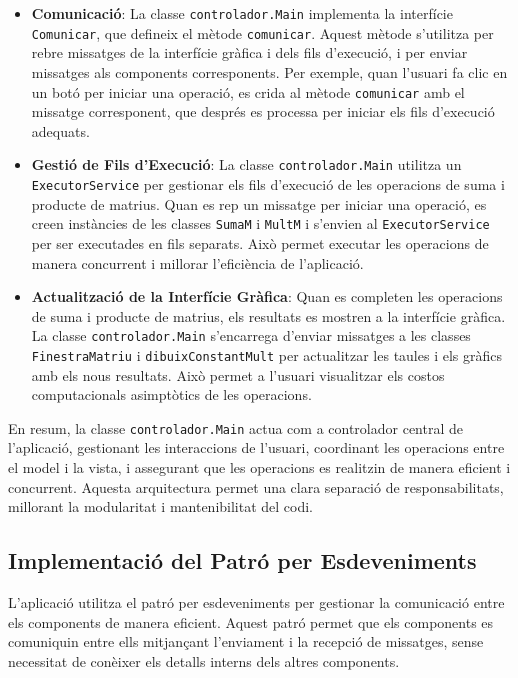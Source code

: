 \documentclass{ieeetj}
\begin{document}
\begin{itemize}
\begin{itemize}
    \item \textbf{Comunicació}: La classe \texttt{controlador.Main} implementa la interfície \texttt{Comunicar}, que defineix el mètode \texttt{comunicar}. Aquest mètode s'utilitza per rebre missatges de la interfície gràfica i dels fils d'execució, i per enviar missatges als components corresponents. Per exemple, quan l'usuari fa clic en un botó per iniciar una operació, es crida al mètode \texttt{comunicar} amb el missatge corresponent, que després es processa per iniciar els fils d'execució adequats.
    
    \item \textbf{Gestió de Fils d'Execució}: La classe \texttt{controlador.Main} utilitza un \texttt{ExecutorService} per gestionar els fils d'execució de les operacions de suma i producte de matrius. Quan es rep un missatge per iniciar una operació, es creen instàncies de les classes \texttt{SumaM} i \texttt{MultM} i s'envien al \texttt{ExecutorService} per ser executades en fils separats. Això permet executar les operacions de manera concurrent i millorar l'eficiència de l'aplicació.
    
    \item \textbf{Actualització de la Interfície Gràfica}: Quan es completen les operacions de suma i producte de matrius, els resultats es mostren a la interfície gràfica. La classe \texttt{controlador.Main} s'encarrega d'enviar missatges a les classes \texttt{FinestraMatriu} i \texttt{dibuixConstantMult} per actualitzar les taules i els gràfics amb els nous resultats. Això permet a l'usuari visualitzar els costos computacionals asimptòtics de les operacions.
\end{itemize}

En resum, la classe \texttt{controlador.Main} actua com a controlador central de l'aplicació, gestionant les interaccions de l'usuari, coordinant les operacions entre el model i la vista, i assegurant que les operacions es realitzin de manera eficient i concurrent. Aquesta arquitectura permet una clara separació de responsabilitats, millorant la modularitat i mantenibilitat del codi.
\end{itemize}

\subsection{Implementació del Patró per Esdeveniments}
L'aplicació utilitza el patró per esdeveniments per gestionar la comunicació entre els components de manera eficient. Aquest patró permet que els components es comuniquin entre ells mitjançant l'enviament i la recepció de missatges, sense necessitat de conèixer els detalls interns dels altres components.
\end{document}
